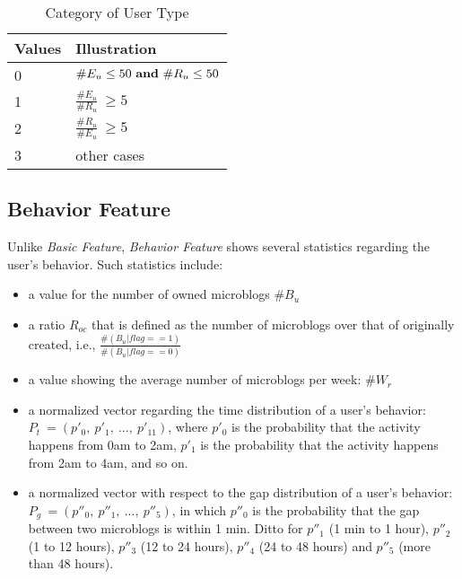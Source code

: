 

\begin{table}[tb!]
\centering
\begin{small}
\caption{Category of User Type}
\vspace{0.3cm}
\label{tbl:ucate}
\begin{tabular}{ll}
\toprule
\multicolumn{1}{l}{\textbf{Values}} & \multicolumn{1}{l}{\textbf{Illustration}}	\\	\midrule \midrule
0                       & $\#E_u \le 50 \ {\bf and} \ \#R_u \le 50$				\\	\midrule
\multirow{2}{*}{1}      & \multirow{2}{*}{$\frac{\#E_u}{\#R_u} \ \ge 5$}	\\
 						&                       									\\	\midrule
\multirow{2}{*}{2}		& \multirow{2}{*}{$\frac{\#R_u}{\#E_u} \ \ge 5$}  \\
						&															\\	\midrule
3                   	& other cases 												\\ \bottomrule
\end{tabular}
\end{small}
\end{table}


\subsection{Behavior Feature}

Unlike \textit{Basic Feature}, \textit{Behavior Feature} shows several statistics regarding the user's \retg{} behavior.
Such statistics include:
\begin{itemize}
	\item a value for the number of owned microblogs $\#B_u$
	\item a ratio $R_{oc}$ that is defined as the number of \retd{} microblogs over that of originally created, i.e., $\frac{\#(B_u | flag ==1)}{\#(B_u | flag ==0)}$
	\item a value showing the average number of \retd{} microblogs per week: $\#W_r$
	\item a normalized vector regarding the time distribution of a user's \retg{} behavior: $P_t\ = (p'_0,\ p'_1,\ ...,\ p'_{11})$, where $p'_0$ is the probability that the \retg{} activity happens from 0am to 2am, $p'_1$ is the probability that the \retg{} activity happens from 2am to 4am, and so on.
	\item a normalized vector with respect to the gap distribution of a user's \retg{} behavior: $P_g\ = (p''_0,\ p''_1,\ ...,\ p''_{5})$, in which $p''_0$ is the probability that the gap between two \retd{} microblogs is within 1 min. Ditto for $p''_1$ (1 min to 1 hour), $p''_2$ (1 to 12 hours), $p''_3$ (12 to 24 hours), $p''_4$ (24 to 48 hours) and  $p''_5$ (more than 48 hours).
\end{itemize}

